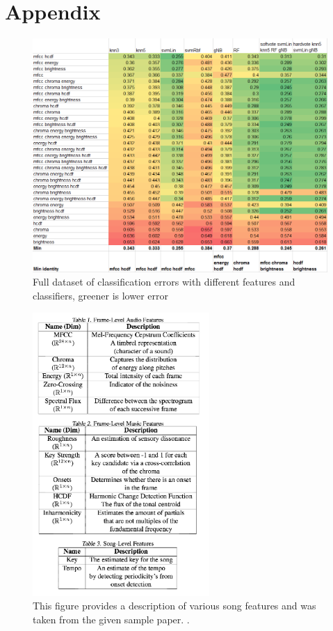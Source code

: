 \documentclass{article} %
\begin{document}
\section{Appendix} \label{section:appendix}
\begin{figure}[V]
	\includegraphics[width=\textwidth]{all_results.png}
	\caption{Full dataset of classification errors with different features and classifiers, greener is lower error}
	\label{fig:all_results}
\end{figure}
\begin{figure}[V]
	\includegraphics[width=0.6\textwidth]{features}
	\caption{This figure provides a description of various song features and was taken from the given sample paper. \cite{sample}.}
	\label{fig:featureSet}
\end{figure}
\end{document}
